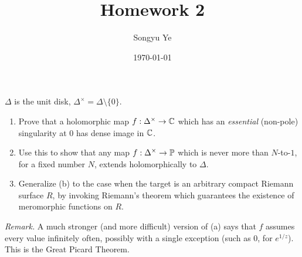 \documentclass[12pt]{article}  %
\title{Homework 2}
\author{Songyu Ye}
\date{\today}
\begin{document}
\psettitle

\begin{problem}[1 (from RS1)]
$\Delta$ is the unit disk, $\Delta^\times = \Delta \setminus \{0\}$.
\begin{enumerate}
  \item Prove that a holomorphic map $f:\Delta^\times \to \C$ which has an \emph{essential} (non-pole) singularity at $0$ has dense image in $\C$.
  \item Use this to show that any map $f:\Delta^\times \to \P$ which is never more than $N$-to-$1$, for a fixed number $N$, extends holomorphically to $\Delta$.
  \item Generalize (b) to the case when the target is an arbitrary compact Riemann surface $R$, by invoking Riemann’s theorem which guarantees the existence of meromorphic functions on $R$.
\end{enumerate}
\emph{Remark.} A much stronger (and more difficult) version of (a) says that $f$ assumes every value infinitely often, possibly with a single exception (such as $0$, for $e^{1/z}$). This is the Great Picard Theorem.
\end{problem}
\end{document}
